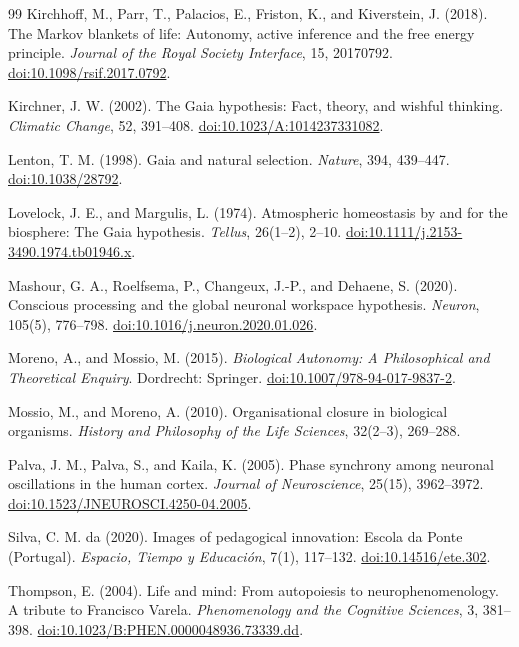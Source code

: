 \documentclass[11pt]{article}
\begin{document}
\begin{thebibliography}{99}
Kirchhoff, M., Parr, T., Palacios, E., Friston, K., and Kiverstein, J. (2018). The Markov blankets of life: Autonomy, active inference and the free energy principle. \emph{Journal of the Royal Society Interface}, 15, 20170792. \href{https://doi.org/10.1098/rsif.2017.0792}{doi:10.1098/rsif.2017.0792}.

Kirchner, J. W. (2002). The Gaia hypothesis: Fact, theory, and wishful thinking. \emph{Climatic Change}, 52, 391--408. \href{https://doi.org/10.1023/A:1014237331082}{doi:10.1023/A:1014237331082}.

Lenton, T. M. (1998). Gaia and natural selection. \emph{Nature}, 394, 439--447. \href{https://doi.org/10.1038/28792}{doi:10.1038/28792}.

Lovelock, J. E., and Margulis, L. (1974). Atmospheric homeostasis by and for the biosphere: The Gaia hypothesis. \emph{Tellus}, 26(1--2), 2--10. \href{https://doi.org/10.1111/j.2153-3490.1974.tb01946.x}{doi:10.1111/j.2153-3490.1974.tb01946.x}.

Mashour, G. A., Roelfsema, P., Changeux, J.-P., and Dehaene, S. (2020). Conscious processing and the global neuronal workspace hypothesis. \emph{Neuron}, 105(5), 776--798. \href{https://doi.org/10.1016/j.neuron.2020.01.026}{doi:10.1016/j.neuron.2020.01.026}.

Moreno, A., and Mossio, M. (2015). \emph{Biological Autonomy: A Philosophical and Theoretical Enquiry}. Dordrecht: Springer. \href{https://doi.org/10.1007/978-94-017-9837-2}{doi:10.1007/978-94-017-9837-2}.

Mossio, M., and Moreno, A. (2010). Organisational closure in biological organisms. \emph{History and Philosophy of the Life Sciences}, 32(2--3), 269--288.

Palva, J. M., Palva, S., and Kaila, K. (2005). Phase synchrony among neuronal oscillations in the human cortex. \emph{Journal of Neuroscience}, 25(15), 3962--3972. \href{https://doi.org/10.1523/JNEUROSCI.4250-04.2005}{doi:10.1523/JNEUROSCI.4250-04.2005}.

Silva, C. M. da (2020). Images of pedagogical innovation: Escola da Ponte (Portugal). \emph{Espacio, Tiempo y Educación}, 7(1), 117--132. \href{https://doi.org/10.14516/ete.302}{doi:10.14516/ete.302}.

Thompson, E. (2004). Life and mind: From autopoiesis to neurophenomenology. A tribute to Francisco Varela. \emph{Phenomenology and the Cognitive Sciences}, 3, 381--398. \href{https://doi.org/10.1023/B:PHEN.0000048936.73339.dd}{doi:10.1023/B:PHEN.0000048936.73339.dd}.


\end{thebibliography}
\end{document}
